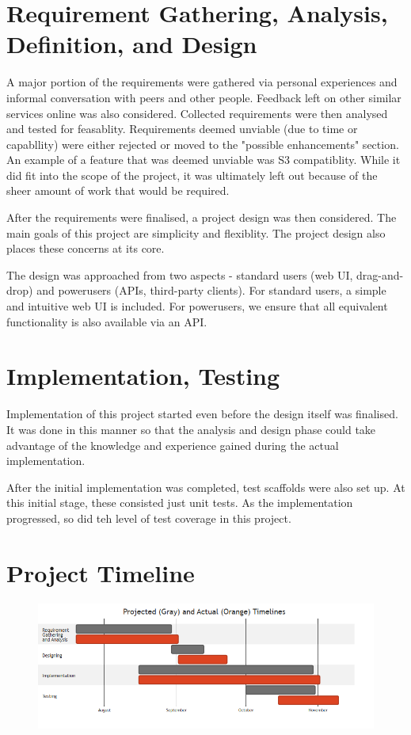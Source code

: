 \documentclass[12pt,a4paper]{report}
\begin{document}
\section{Requirement Gathering, Analysis, Definition, and Design}\label{sec:req}
A major portion of the requirements were gathered via personal experiences and informal conversation with peers and other people.
Feedback left on other similar services online was also considered.
Collected requirements were then analysed and tested for feasablity.
Requirements deemed unviable (due to time or capabllity) were either rejected or moved to the "possible enhancements" section.
An example of a feature that was deemed unviable was S3 compatiblity.
While it did fit into the scope of the project, it was ultimately left out because of the sheer amount of work that would be required.

After the requirements were finalised, a project design was then considered.
The main goals of this project are simplicity and flexiblity.
The project design also places these concerns at its core.

The design was approached from two aspects - standard users (web UI, drag-and-drop) and powerusers (APIs, third-party clients).
For standard users, a simple and intuitive web UI is included.
For powerusers, we ensure that all equivalent functionality is also available via an API.

\section{Implementation, Testing}\label{sec:impl}
Implementation of this project started even before the design itself was finalised.
It was done in this manner so that the analysis and design phase could take advantage of the knowledge and experience gained during the actual implementation.

After the initial implementation was completed, test scaffolds were also set up.
At this initial stage, these consisted just unit tests.
As the implementation progressed, so did teh level of test coverage in this project.

\section{Project Timeline}\label{sec:gantt}
\begin{figure}[H]
	\includegraphics[width=\textwidth]{gantt.png}
\end{figure}
\end{document}
